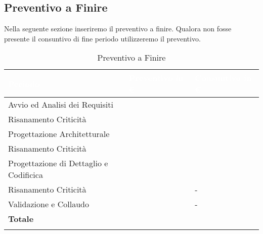 \subsection{Preventivo a Finire}
\label{caption_paf}

Nella seguente sezione inseriremo il preventivo a finire. Qualora non fosse presente il consuntivo di fine periodo utilizzeremo il preventivo. \\

\begin{longtable}{| C{.30\textwidth}| C{.15\textwidth}| C{.20\textwidth}|}
\hline
{}\textbf{\textcolor{white}{Periodo}} & \textbf{\textcolor{white}{Preventivo in \euro}} & \textbf{\textcolor{white}{Consuntivo in \euro}} \\
\hline
Avvio ed Analisi dei Requisiti &  &  \\
\hline
{}Risanamento Criticità &   &  \\
\hline
Progettazione Architetturale &  &  \\
\hline
{} Risanamento Criticità &  &  \\
\hline
Progettazione di Dettaglio e Codificica &  &  \\
\hline
{} Risanamento Criticità &   & - \\
\hline
Validazione e Collaudo &   & - \\
\hline
{}\textbf{Totale} &   &   \\
\hline
\caption{Preventivo a Finire}
\label{paf}
\end{longtable}

